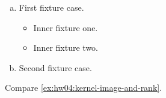 \begin{enumerate}[(a)][2]
  \item First fixture case.
    \begin{itemize}
      \item Inner fixture one.
      \item Inner fixture two.
    \end{itemize}
  \item Second fixture case.
\end{enumerate}
Compare \autoref{ex:hw04:kernel-image-and-rank}.

